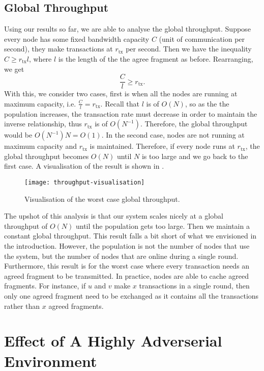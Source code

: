 \subsection{Global Throughput}
Using our results so far, we are able to analyse the global throughput.
Suppose every node has some fixed bandwidth capacity $C$ (unit of communication per second),
they make transactions at $r_{\text{tx}}$ per second.
Then we have the inequality $C \ge r_{\text{tx}} l$, where $l$ is the length of the the agree fragment as before.
Rearranging, we get
$$\frac{C}{l} \ge r_{\text{tx}}.$$
With this, we consider two cases, first is  when all the nodes are running at maximum capacity, i.e. $\frac{C}{l} = r_{\text{tx}}$.
Recall that $l$ is of $O(N)$, so as the the population increases, 
the transaction rate must decrease in order to maintain the inverse relationship,
thus $r_\text{tx}$ is of $O(N^{-1})$. %
Therefore, the global throughput would be $O(N^{-1})N = O(1)$.
In the second case, nodes are not running at maximum capacity and $r_{\text{tx}}$ is maintained.
Therefore, if every node runs at $r_{\text{tx}}$,
the global throughput becomes $O(N)$ until $N$ is too large and we go back to the first case.
A visualisation of the result is shown in .

\begin{figure}[h]
  \centering
  \texttt{[image: throughput-visualisation]}
  \caption{Visualisation of the worst case global throughput.}
  \label{fig:throughput-visualisation}
\end{figure}

The upshot of this analysis is that our system scales nicely at a global throughput of $O(N)$ until the population gets too large.
Then we maintain a constant global throughput.
This result falls a bit short of what we envisioned in the introduction.
However, the population is not the number of nodes that use the system, but the number of nodes that are online during a single round.
Furthermore, this result is for the worst case where every transaction needs an agreed fragment to be transmitted.
In practice, nodes are able to cache agreed fragments.
For instance, if $u$ and $v$ make $x$ transactions in a single round,
then only one agreed fragment need to be exchanged as it contains all the transactions rather than $x$ agreed fragments.

\section{Effect of A Highly Adverserial Environment}
